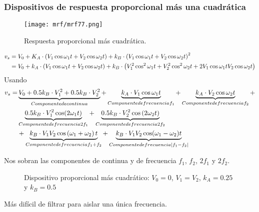 \documentclass[
	12pt, %
	fleqn, %
	a4paper, %
	oneside, %
]{LegrandOrangeBook}
\begin{document}
\subsubsection*{Dispositivos de respuesta proporcional más una cuadrática}
\begin{figure}[H]
\centering
\texttt{[image: mrf/mrf77.png]}
\caption{Respuesta proporcional más cuadrática.}
\label{fig:proporcional cuadratica}
\end{figure}
\begin{align*}
v_s&=V_0+K_A\cdot\left(V_1\cos\omega_1t+V_2\cos\omega_2t\right)+k_B\cdot\left(V_1\cos\omega_1t+V_2\cos\omega_2t\right)^2\\
&=V_0+k_A\cdot\left(V_1\cos\omega_1t+V_2\cos\omega_2t\right)+k_B\cdot\left(V_1^2\cos^2\omega_1t+V_2^2\cos^2\omega_2t+2V_1\cos\omega_1tV_2\cos\omega_2t\right)
\end{align*}
Usando 
\begin{align*}
v_s=&\underbrace{V_0+0.5k_B\cdot V_1^2+0.5k_B\cdot V_2^2}_{Componente de continua}+\underbrace{k_A\cdot V_1\cos\omega_1t}_{Componente de frecuencia f_1}+\underbrace{k_A\cdot V_2\cos\omega_2t}_{Componente de frecuencia f_2}+\\
&\underbrace{0.5k_B\cdot V_1^2\cos(2\omega_1t)}_{Componente de frecuencia 2f_1}+\underbrace{0.5k_B\cdot V_2^2\cos\left(2\omega_2t\right)}_{Componente de frecuencia 2f_2}\\
&+\underbrace{k_B\cdot V_1V_2\cos\left(\omega_1+\omega_2\right)t}_{Componente de frecuencia f_1+f_2}+\underbrace{k_B\cdot V_1V_2\cos(\omega_1-\omega_2)t}_{Componente de frecuencia |f_1-f_2|}
\end{align*}
\begin{corollary}
Nos sobran las componentes de continua y de frecuencia $f_1$, $f_2$, $2f_1$ y $2f_2$.
\end{corollary}
\begin{figure}[]
\centering
{}
\caption{Dispositivo proporcional más cuadrático: $V_0=0$, $V_1=V_2$, $k_A=0.25$ y $k_B=0.5$}
\end{figure}
Más difícil de filtrar para aislar una única frecuencia.
\end{document}
